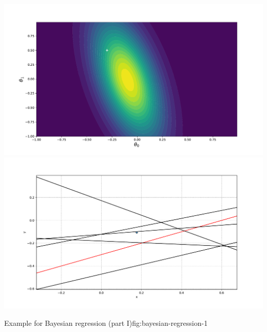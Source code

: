 \begin{frame}
{\begin{minipage}{0.45\textwidth}
			\includegraphics[scale=0.17]{18_advanced_regression/02_img/posterior_1} \\[-2mm]
			\includegraphics[scale=0.17]{18_advanced_regression/02_img/samples_1}
		\end{minipage}
	}{Example for Bayesian regression (part I)}{fig:bayesian-regression-1}
\end{frame}


